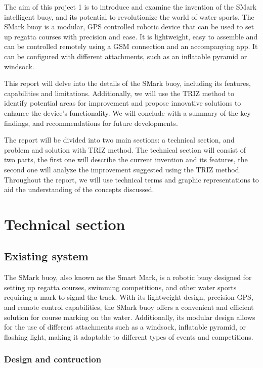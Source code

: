 \documentclass[12pt, twoside]{report}
\begin{document}
The aim of this project 1 is to introduce and examine the invention of the SMark intelligent buoy, and its potential to revolutionize the world of water sports. The SMark buoy is a modular, GPS controlled robotic device that can be used to set up regatta courses with precision and ease. It is lightweight, easy to assemble and can be controlled remotely using a GSM connection and an accompanying app. It can be configured with different attachments, such as an inflatable pyramid or windsock.

This report will delve into the details of the SMark buoy, including its features, capabilities and limitations. Additionally, we will use the TRIZ method to identify potential areas for improvement and propose innovative solutions to enhance the device's functionality. We will conclude with a summary of the key findings, and recommendations for future developments.

The report will be divided into two main sections: a technical section, and problem and solution with TRIZ method. The technical section will consist of two parts, the first one will describe the current invention and its features, the second one will analyze the improvement suggested using the TRIZ method. Throughout the report, we will use technical terms and graphic representations to aid the understanding of the concepts discussed.

\section{Technical section}
\subsection{Existing system}

The SMark buoy, also known as the Smart Mark, is a robotic buoy designed for setting up regatta courses, swimming competitions, and other water sports requiring a mark to signal the track. With its lightweight design, precision GPS, and remote control capabilities, the SMark buoy offers a convenient and efficient solution for course marking on the water. Additionally, its modular design allows for the use of different attachments such as a windsock, inflatable pyramid, or flashing light, making it adaptable to different types of events and competitions.

\subsubsection{Design and contruction}
\end{document}
